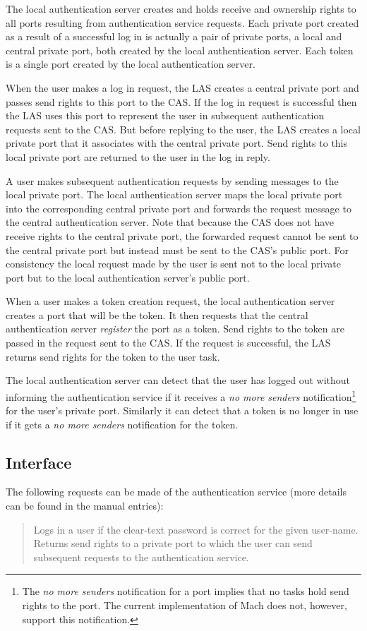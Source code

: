 The local authentication server creates and holds receive and ownership
rights to all ports resulting from authentication service requests.  Each
private port created as a result of a successful log in is actually a pair
of private ports, a local and central private port, both created by the
local authentication server.  Each token is a single port created by the
local authentication server.

When the user makes a log in request, the LAS creates a central private port
and passes send rights to this port to the CAS.  If the log in request is
successful then the LAS uses this port to represent the user in subsequent
authentication requests sent to the CAS.  But before replying to the user,
the LAS creates a local private port that it associates with the central
private port.  Send rights to this local private port are returned to the
user in the log in reply.

A user makes subsequent authentication requests by sending messages to the
local private port.  The local authentication server maps the local private
port into the corresponding central private port and forwards the request
message to the central authentication server.  Note that because the CAS
does not have receive rights to the central private port, the forwarded
request cannot be sent to the central private port but instead must be sent
to the CAS's public port.  For consistency the local request made by the
user is sent not to the local private port but to the local authentication
server's public port.

When a user makes a token creation request, the local authentication server
creates a port that will be the token.  It then requests that the central
authentication server {\em register\/} the port as a token.  Send rights to
the token are passed in the request sent to the CAS.  If the request is
successful, the LAS returns send rights for the token to the user task.

The local authentication server can detect that the user has logged out
without informing the authentication service if it receives a {\em no more
senders\/} notification\footnote{The {\em no more senders\/} notification
for a port implies that no tasks hold send rights to the port.  The current
implementation of Mach does not, however, support this notification.} for
the user's private port.  Similarly it can detect that a token is no longer
in use if it gets a {\em no more senders\/} notification for the token.

\subsection{Interface}
The following requests can be made of the authentication service (more
details can be found in the manual entries):
\begin{quotation} 

Logs in a user if the clear-text password is correct for the given
user-name.  Returns send rights to a private port to which the user can send
subsequent requests to the authentication service.
\end{quotation}

